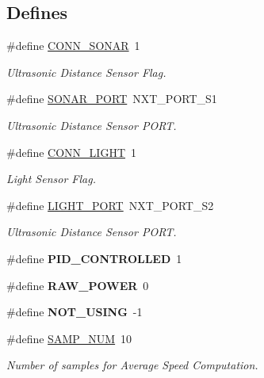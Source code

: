 \subsection*{Defines}
\begin{DoxyCompactItemize}
\item 
\#define \hyperlink{group___b_r_o_s_client_gad9e94416ba83380751dc4588286d8130}{CONN\_\-SONAR}~1
\begin{DoxyCompactList}\small\item\em Ultrasonic Distance Sensor Flag. \item\end{DoxyCompactList}\item 
\#define \hyperlink{group___b_r_o_s_client_ga72f4e7f36b69fdd1b3874e0824c0316a}{SONAR\_\-PORT}~NXT\_\-PORT\_\-S1
\begin{DoxyCompactList}\small\item\em Ultrasonic Distance Sensor PORT. \item\end{DoxyCompactList}\item 
\#define \hyperlink{group___b_r_o_s_client_ga82692265ede80e0cfdfe84a87d3093f1}{CONN\_\-LIGHT}~1
\begin{DoxyCompactList}\small\item\em Light Sensor Flag. \item\end{DoxyCompactList}\item 
\#define \hyperlink{group___b_r_o_s_client_gafe5f0db4351597e50603e53a4a7d0051}{LIGHT\_\-PORT}~NXT\_\-PORT\_\-S2
\begin{DoxyCompactList}\small\item\em Ultrasonic Distance Sensor PORT. \item\end{DoxyCompactList}\item 
\hypertarget{group___b_r_o_s_client_gab7639a7ba7ef8c7dab82759c5ef5a9a8}{
\#define {\bfseries PID\_\-CONTROLLED}~1}
\label{group___b_r_o_s_client_gab7639a7ba7ef8c7dab82759c5ef5a9a8}

\item 
\hypertarget{group___b_r_o_s_client_gaf89a62f836d5ac2ffa204a4dd0615a8d}{
\#define {\bfseries RAW\_\-POWER}~0}
\label{group___b_r_o_s_client_gaf89a62f836d5ac2ffa204a4dd0615a8d}

\item 
\hypertarget{group___b_r_o_s_client_gac420162ed79637b2e19a25d7e01cbf6c}{
\#define {\bfseries NOT\_\-USING}~-\/1}
\label{group___b_r_o_s_client_gac420162ed79637b2e19a25d7e01cbf6c}

\item 
\#define \hyperlink{group___b_r_o_s_client_gaeef07cfe778af527fd0738e828efa43a}{SAMP\_\-NUM}~10
\begin{DoxyCompactList}\small\item\em Number of samples for Average Speed Computation. \item\end{DoxyCompactList}\end{DoxyCompactItemize}


